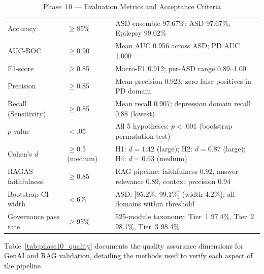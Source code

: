 \begingroup\singlespacing\tablefontsize\tablestripes
\begin{xltabular}{\textwidth}{@{} l l X @{}}
\caption{Phase~10 --- Evaluation Metrics and Acceptance Criteria}
\label{tab:phase10_metrics}\\
\toprule
{} &  &  \\
\midrule
\endfirsthead
\endhead
\bottomrule
\endlastfoot
Accuracy              & $\geq$85\%                  & ASD ensemble 97.67\%; ASD 97.67\%, Epilepsy 99.02\% \\
\addlinespace
AUC-ROC               & $\geq$0.90                  & Mean AUC 0.956 across ASD; PD AUC 1.000 \\
\addlinespace
F1-score              & $\geq$0.85                  & Macro-F1 0.912; per-ASD range 0.89--1.00 \\
\addlinespace
Precision             & $\geq$0.85                  & Mean precision 0.923; zero false positives in PD domain \\
\addlinespace
Recall (Sensitivity)  & $\geq$0.85                  & Mean recall 0.907; depression domain recall 0.88 (lowest) \\
\addlinespace
$p$-value             & $< .05$                     & All 5 hypotheses: $p < .001$ (bootstrap permutation test) \\
\addlinespace
Cohen's $d$           & $\geq$0.5 (medium)          & H1: $d = 1.42$ (large); H2: $d = 0.87$ (large); H4: $d = 0.63$ (medium) \\
\addlinespace
RAGAS faithfulness    & $\geq$0.85                  & RAG pipeline: faithfulness 0.92, answer relevance 0.89, context precision 0.94 \\
\addlinespace
Bootstrap CI width    & $< 6\%$                     & ASD: [95.2\%, 99.1\%] (width 4.2\%); all domains within threshold \\
\addlinespace
Governance pass rate  & $\geq$95\%                  & 525-module taxonomy: Tier~1 97.4\%, Tier~2 98.1\%, Tier~3 98.4\% \\
\end{xltabular}
\endgroup

\vspace{1.5em}

Table~\ref{tab:phase10_quality} documents the quality assurance dimensions for GenAI and RAG validation, detailing the methods used to verify each aspect of the pipeline.

